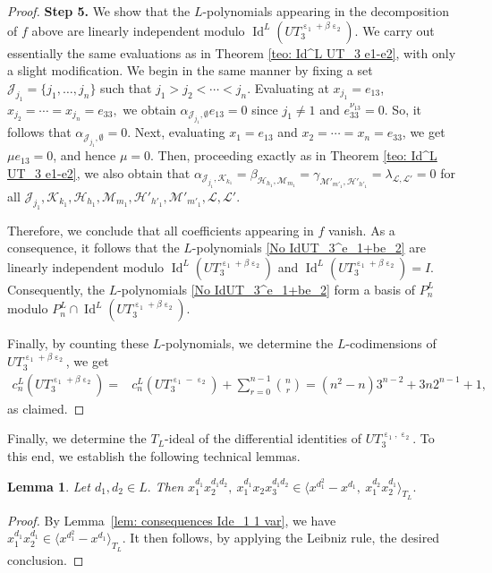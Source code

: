 \documentclass[a4paper,reqno]{amsart}
\newtheorem{lemma}[theorem]{Lemma}
\theoremstyle{definition}
\numberwithin{equation}{section}
\numberwithin{theorem}{section}
\DeclareMathOperator{\I}{Id}
\DeclareMathOperator{\e}{\varepsilon}
\begin{document}
\begin{proof}
\textbf{Step 5.} We show that the $L$-polynomials appearing in the decomposition of $f$ above are
linearly independent modulo $\I^L(UT_3^{\e_1+\beta\e_2})$.
 We carry out essentially the same evaluations as in Theorem \ref{teo: Id^L UT_3 e1-e2}, with only a slight modification. We begin in the same manner by fixing a set $\mathcal{J}_{j_1}=\{j_1,\ldots,j_n\}$ such that $j_1>j_2<  \cdots < j_n.$ Evaluating at $ x_{j_1}= e_{13}$, $x_{j_2}=\cdots = x_{j_n}= e_{33},$ we obtain $\alpha_{ \mathcal{J}_{j_1}, \emptyset}  e_{13}=0$ since $j_1\neq 1$ and $e_{33}^{\nu_{13}}=0$. So, it follows that $ \alpha_{ \mathcal{J}_{j_1}, \emptyset}=0$. Next, evaluating $x_1=e_{13}$ and $x_2=\cdots=x_n=e_{33}$, we get $\mu  e_{13}=0$, and hence $\mu=0$. Then, proceeding exactly as in Theorem \ref{teo: Id^L UT_3 e1-e2}, we also obtain that $\alpha_{ \mathcal{J}_{j_1}, \mathcal{K}_{k_1}} = \beta_{ \mathcal{H}_{h_1}, \mathcal{M}_{m_1}}=\gamma_{ \mathcal{M}'_{m'_1}, \mathcal{H}'_{h'_1}}=\lambda_{ \mathcal{L}, \mathcal{L}'}  =0 $ for all $\mathcal{J}_{j_1}, \mathcal{K}_{k_1},\mathcal{H}_{h_1}, \mathcal{M}_{m_1},\mathcal{H}'_{h'_1}, \mathcal{M}'_{m'_1},\mathcal{L}, \mathcal{L}'$. 

Therefore, we conclude that all coefficients appearing in $f$ vanish. As a consequence, it follows that the $L$-polynomials  \eqref{No IdUT_3^e_1+be_2} are linearly independent modulo $\I^L(UT_3^{\e_1+\beta\e_2})$ and $\I^L(UT_3^{\e_1+\beta\e_2})= I$. Consequently, the $L$-polynomials \eqref{No IdUT_3^e_1+be_2} form a basis of $P_n^L$ modulo $P_n^L\cap \I^L(UT_3^{\e_1+\beta\e_2}).$ 


Finally, by counting these $L$-polynomials, we determine the $L$-codimensions of $UT_3^{\e_1+\beta\e_2}$, we get
\begin{align*}
     c_n^L(UT_3^{\e_1+\beta\e_2})=&c_n^L(UT_3^{\e_1 - \e_2}) + \sum_{r=0}^{n-1} \binom{n}{r}
    =(n^2-n)3^{n-2}+3n2^{n-1}+1,
\end{align*}
as claimed.
\end{proof}








Finally, we determine the $T_L$-ideal of the differential identities of $UT_3^{\e_1, \e_2}.$ To this end, we establish the following technical lemmas.

\begin{lemma} \label{lem: consequence e_1 e_2 1var}
Let $d_1,d_2\in L.$
Then $x_1^{d_1} x_2^{d_1 d_2}, \ x_1^{d_1} x_2 x_3^{d_1 d_2} \in \langle x^{d_1^2}-x^{d_1},\ x_1^{d_2}x_2^{d_1}\rangle_{T_L}.$
\end{lemma}
\begin{proof}
By Lemma~\ref{lem: consequences Ide_1 1 var}, we have  $x_1^{d_1}x_2^{d_1}\in \langle x^{d_1^2}-x^{d_1}\rangle_{T_L}.$ It then follows, by applying the Leibniz rule, the desired conclusion.
\end{proof}
\end{document}
